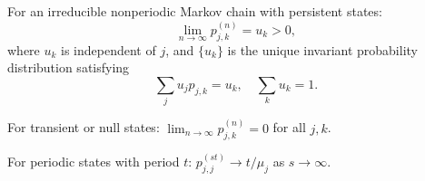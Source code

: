 For an irreducible nonperiodic Markov chain with persistent states:
$$\lim_{n \to \infty} p_{j,k}^{(n)} = u_k > 0,$$
where $u_k$ is independent of $j$, and $\{u_k\}$ is the unique invariant probability distribution satisfying
$$\sum_j u_j p_{j,k} = u_k, \quad \sum_k u_k = 1.$$

For transient or null states: $\lim_{n \to \infty} p_{j,k}^{(n)} = 0$ for all $j, k$.

For periodic states with period $t$: $p_{j,j}^{(st)} \to t/\mu_j$ as $s \to \infty$.
